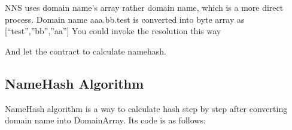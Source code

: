 \documentclass[letterpaper,10pt,english]{sphinxmanual}
\begin{document}
NNS uses domain name’s array rather domain name, which is a more direct process.
Domain name aaa.bb.test is converted into byte array as {[}“test”,”bb”,”aa”{]}
You could invoke the resolution this way

%
\begin{sphinxVerbatim}[commandchars=\\\{\}]
\PYG{p}{[}\PYG{p}{]}
\end{sphinxVerbatim}

And let the contract to calculate namehash.


\subsection{NameHash Algorithm}
\label{\detokenize{nns_protocol:namehash-algorithm}}
NameHash algorithm is a way to calculate hash step by step after converting domain name into DomainArray. Its code is as follows:
\end{document}
